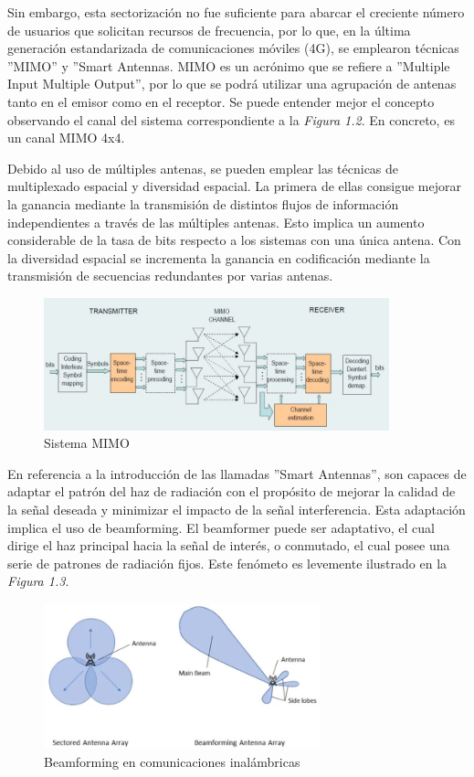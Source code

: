 \documentclass[a4paper,11pt]{book}
\begin{document}
	
	Sin embargo, esta sectorización no fue suficiente para abarcar el creciente número de usuarios que solicitan recursos de frecuencia, por lo que, en la última generación estandarizada de comunicaciones móviles (4G), se emplearon técnicas ''MIMO'' y ''Smart Antennas. MIMO es un acrónimo que se refiere a ''Multiple Input Multiple Output'', por lo que se podrá utilizar una agrupación de antenas tanto en el emisor como en el receptor. Se puede entender mejor el concepto observando el canal del sistema correspondiente a la \textit{Figura 1.2}. En concreto, es un canal MIMO 4x4.
		
		Debido al uso de múltiples antenas, se pueden emplear las técnicas de multiplexado espacial y diversidad espacial. La primera de ellas consigue mejorar la ganancia mediante la transmisión de distintos flujos de información independientes a través de las múltiples antenas. Esto implica un aumento considerable de la tasa de bits respecto a los sistemas con una única antena. Con la diversidad espacial se incrementa la ganancia en codificación mediante la transmisión de secuencias redundantes por varias antenas.
		
		\begin{figure}[hbtp]
		\centering
		\includegraphics[width = 10cm]{FIGURAS/sistema_MIMO.JPG}
		\caption{Sistema MIMO}
		\end{figure}

		En referencia a la introducción de las llamadas ''Smart Antennas'', son capaces de adaptar el patrón del haz de radiación con el propósito de mejorar la calidad de la señal deseada y minimizar el impacto de la señal interferencia. Esta adaptación implica el uso de beamforming. El beamformer puede ser adaptativo, el cual dirige el haz principal hacia la señal de interés, o conmutado, el cual posee una serie de patrones de radiación fijos. Este fenómeto es levemente ilustrado en la \textit{Figura 1.3}.
		\begin{figure}[hbtp]
		\centering
		\includegraphics[width = 8cm]{FIGURAS/beamformer_adaptativo.JPG}
		\caption{Beamforming en comunicaciones inalámbricas}
		\end{figure}
		
\end{document}
